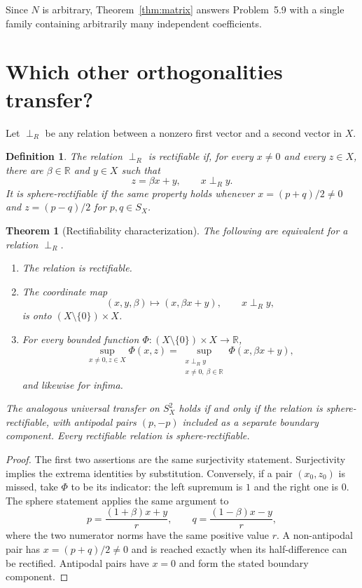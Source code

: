 \documentclass[11pt]{article}
\newtheorem{theorem}{Theorem}
\newtheorem{definition}{Definition}
\newcommand{\R}{\mathbb R}
\newcommand{\SX}{S_X}
\begin{document}
Since $N$ is arbitrary, Theorem~\ref{thm:matrix} answers Problem~5.9 with a
single family containing arbitrarily many independent coefficients.

\section{Which other orthogonalities transfer?}

Let $\mathrel{\perp_R}$ be any relation between a nonzero first vector and a
second vector in $X$.

\begin{definition}
The relation $\perp_R$ is \emph{rectifiable} if, for every $x\ne0$ and every
$z\in X$, there are $\beta\in\R$ and $y\in X$ such that
\[
 z=\beta x+y,\qquad x\perp_R y.
\]
It is \emph{sphere-rectifiable} if the same property holds whenever
$x=(p+q)/2\ne0$ and $z=(p-q)/2$ for $p,q\in\SX$.
\end{definition}

\begin{theorem}[Rectifiability characterization]\label{thm:rectification}
The following are equivalent for a relation $\perp_R$.
\begin{enumerate}
 \item The relation is rectifiable.
 \item The coordinate map
 \[
 (x,y,\beta)\longmapsto(x,\beta x+y),\qquad x\perp_R y,
 \]
 is onto $(X\setminus\{0\})\times X$.
 \item For every bounded function $\Phi:(X\setminus\{0\})\times X\to\R$,
 \[
 \sup_{x\ne0,z\in X}\Phi(x,z)
 =\sup_{\substack{x\perp_R y\\x\ne0,\ \beta\in\R}}
 \Phi(x,\beta x+y),
 \]
 and likewise for infima.
\end{enumerate}
The analogous universal transfer on $\SX^2$ holds if and only if the relation
is sphere-rectifiable, with antipodal pairs $(p,-p)$ included as a separate
boundary component.  Every rectifiable relation is sphere-rectifiable.
\end{theorem}

\begin{proof}
The first two assertions are the same surjectivity statement.  Surjectivity
implies the extrema identities by substitution.  Conversely, if a pair
$(x_0,z_0)$ is missed, take $\Phi$ to be its indicator: the left supremum is
$1$ and the right one is $0$.  The sphere statement applies the same argument
to
\[
 p=\frac{(1+\beta)x+y}{r},\qquad
 q=\frac{(1-\beta)x-y}{r},
\]
where the two numerator norms have the same positive value $r$.  A non-antipodal
pair has $x=(p+q)/2\ne0$ and is reached exactly when its half-difference can be
rectified.  Antipodal pairs have $x=0$ and form the stated boundary component.
\end{proof}
\end{document}
